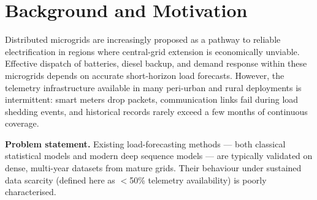 \section{Background and Motivation}
Distributed microgrids are increasingly proposed as a pathway to reliable electrification in
regions where central-grid extension is economically unviable. Effective dispatch of
batteries, diesel backup, and demand response within these microgrids depends on accurate
short-horizon load forecasts. However, the telemetry infrastructure available in many
peri-urban and rural deployments is intermittent: smart meters drop packets, communication
links fail during load shedding events, and historical records rarely exceed a few months of
continuous coverage.

\begin{notebox}
\textbf{Problem statement.} Existing load-forecasting methods --- both classical statistical
models and modern deep sequence models --- are typically validated on dense, multi-year
datasets from mature grids. Their behaviour under sustained data scarcity (defined here as
$<$50\% telemetry availability) is poorly characterised.
\end{notebox}
